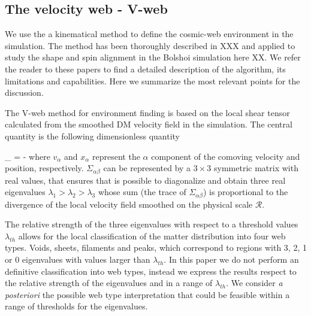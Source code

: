 \documentclass[usenatbib]{latex/mn2e}
\begin{document}
\subsection{The velocity  web - V-web}
\label{sec:Vweb}



We use the a kinematical method to define the cosmic-web environment in 
the simulation. The method has been thoroughly described in XXX and 
applied to study the shape and spin alignment in the Bolshoi simulation 
here XX. We refer the reader to these papers to find a detailed 
description of the algorithm, its limitations and capabilities. Here we 
summarize the most relevant points for the discussion. 



The V-web method for environment finding is based on the local shear 
tensor calculated from the smoothed DM velocity field in the simulation.
The central quantity is the following dimensionless quantity 


{
\Sigma_{\alpha\beta} = -
}
where $v_{\alpha}$ and $x_{\alpha}$ represent the $\alpha$ component of 
the comoving velocity and position, respectively. $\Sigma_{\alpha\beta}$ 
can be represented by a $3\times 3$ symmetric matrix with real values,
that ensures that is possible to diagonalize and obtain three real 
eigenvalues $\lambda_{1} > \lambda_{2}>\lambda_3$ whose sum (the trace of
$\Sigma_{\alpha\beta}$) is proportional to the divergence of the local 
velocity field smoothed on the physical scale ${\mathcal R}$. 



The relative strength of the three eigenvalues with respect to a threshold
values $\lambda_{th}$ allows for the local classification of the matter 
distribution into four web types. Voids, sheets, filaments and peaks, 
which correspond to regions with 3, 2, 1 or 0 eigenvalues with values 
larger than $\lambda_{th}$. In this paper we do not perform an definitive 
classification into web types, instead we express the results respect to 
the relative strength of the eigenvalues and in a range of $\lambda_{th}$.
We consider \textit{a posteriori} the possible web type interpretation 
that could be feasible within a range of thresholds for the eigenvalues. 
\end{document}
